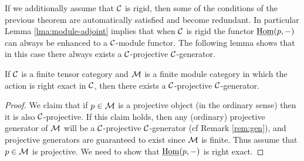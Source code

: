 \documentclass{amsart}
\begin{document}
If we additionally assume that $\mathcal C$ is rigid, then some of the conditions of the previous theorem are automatically satisfied and become redundant. In particular Lemma \ref{lma:module-adjoint} implies that when $\mathcal C$ is rigid the functor $\operatorname{\underline{Hom}}(p,-)$ can always be enhanced to a $\mathcal C$-module functor.  The following lemma shows that in this case there always exists a $\mathcal C$-projective $\mathcal C$-generator.  
\begin{lemma}{\cite[\S 2.11]{EGNO}} \label{lma:Enough_C-projs}
	If $\mathcal C$ is a finite tensor category and $\mathcal M$ is a finite module category in which the action is right exact in $\mathcal C$, then there exists a $\mathcal C$-projective $\mathcal C$-generator.   
\end{lemma}   
\begin{proof}
	We claim that if $p \in \mathcal M$ is a projective object (in the ordinary sense) then it is also $\mathcal C$-projective. If this claim holds, then any (ordinary) projective generator of $\mathcal M$ will be a $\mathcal C$-projective $\mathcal C$-generator (cf Remark \ref{rem:gen}), and projective generators are guaranteed to exist since $\mathcal M$ is finite. 
	Thus assume that $p \in \mathcal M$ is projective.  We need to show that $\operatorname{\underline{Hom}}(p, -)$ is right exact. 
	

\end{proof}
\end{document}
